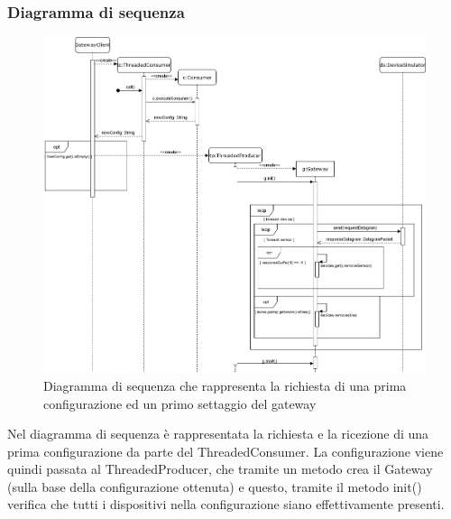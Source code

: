 	\begin{landscape}
		\subsubsection{Diagramma di sequenza}%
		  	\begin{figure}[H]
				\centering
				\includegraphics[scale=0.400]{res/images/GATEWAY/RichiestaInvioGateway.png}
				\caption{Diagramma di sequenza che rappresenta la richiesta di una prima configurazione ed un primo settaggio del gateway}
				\label{Diagramma 3}
			\end{figure}
			Nel diagramma di sequenza è rappresentata la richiesta e la ricezione di una prima configurazione da parte del ThreadedConsumer. La configurazione viene quindi passata al ThreadedProducer, che tramite un metodo crea il Gateway (sulla base della configurazione ottenuta) e questo, tramite il metodo init() verifica che tutti i dispositivi nella configurazione siano effettivamente presenti.
	\end{landscape}
	
